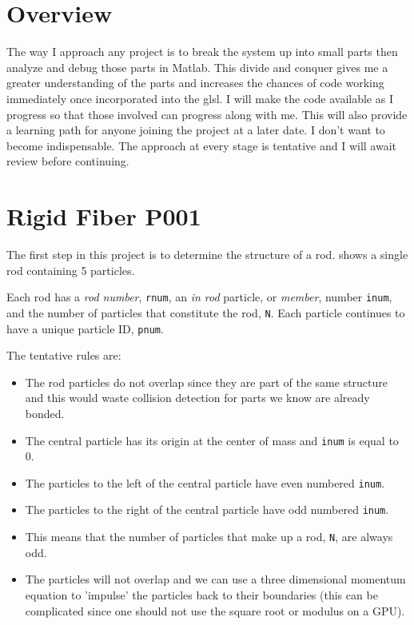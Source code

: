 
\section{Overview} \label{ovr}

The way I approach any project is to break the system up into small parts then analyze and debug those parts in Matlab. This divide and conquer gives me a greater understanding of the parts and increases the chances of code working immediately once incorporated into the glsl. I will make the code available as I progress so that those involved can progress along with me. This will also provide a learning path for anyone joining the project at a later date. I don't want to become indispensable. The approach at every stage is tentative and I will await review before continuing.

\section{Rigid Fiber P001} \label{p001}

The first step in this project is to determine the structure of a rod. 
 shows a single rod containing 5 particles. 


Each rod has a \textit{rod number}, \texttt{rnum}, an \textit{in rod} particle, or \textit{member}, number \texttt{inum}, and the number of particles that constitute the rod, \texttt{N}. Each particle continues to have a unique particle ID, \texttt{pnum}.
 
The tentative rules are:
\begin{itemize}
\item The rod particles do not overlap since they are part of the same structure and this would waste collision detection for parts we know are already bonded.
\item The central particle has its origin at the center of mass and \texttt{inum} is equal to 0.
\item The particles to the left of the central particle have even numbered \texttt{inum}.
\item The particles to the right of the central particle have odd numbered \texttt{inum}.
\item This means that the number of particles that make up a rod, \texttt{N}, are always odd.
\item The particles will not overlap and we can use a three dimensional momentum equation to 'impulse' the particles back to their boundaries (this can be complicated since one should not use the square root or modulus on a GPU).
\end{itemize}

